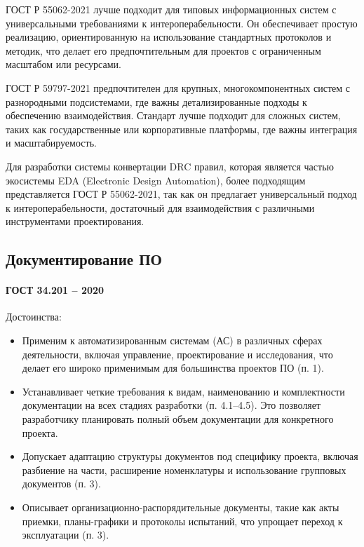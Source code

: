 ГОСТ Р 55062-2021 лучше подходит для типовых информационных систем
с универсальными требованиями к интероперабельности.
Он обеспечивает простую реализацию,
ориентированную на использование стандартных протоколов и методик,
что делает его предпочтительным
для проектов с ограниченным масштабом или ресурсами.

ГОСТ Р 59797-2021 предпочтителен для крупных,
многокомпонентных систем с разнородными подсистемами,
где важны детализированные подходы к обеспечению взаимодействия.
Стандарт лучше подходит для сложных систем,
таких как государственные или корпоративные платформы,
где важны интеграция и масштабируемость.

Для разработки системы конвертации DRC правил,
которая является частью экосистемы EDA (Electronic Design Automation),
более подходящим представляется ГОСТ Р 55062-2021,
так как он предлагает универсальный подход к интероперабельности,
достаточный для взаимодействия с различными инструментами проектирования.

\subsection{Документирование ПО}

\paragraph{ГОСТ 34.201 -- 2020}

Достоинства:

\begin{itemize}
	\item Применим к автоматизированным системам (АС)
		в различных сферах деятельности, включая управление,
		проектирование и исследования,
		что делает его широко применимым для большинства проектов ПО (п. 1).
	\item Устанавливает четкие требования к видам,
		наименованию и комплектности документации
		на всех стадиях разработки (п. 4.1–4.5).
		Это позволяет разработчику планировать полный объем документации
		для конкретного проекта.
	\item Допускает адаптацию структуры документов под специфику проекта,
		включая разбиение на части, расширение номенклатуры
		и использование групповых документов (п. 3).
	\item Описывает организационно-распорядительные документы,
		такие как акты приемки, планы-графики и протоколы испытаний,
		что упрощает переход к эксплуатации (п. 3).
\end{itemize}

